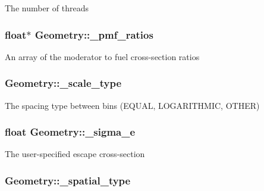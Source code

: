 The number of threads \hypertarget{classGeometry_a4bb0c2db80028191a363a79669e2508b}{
\subsubsection[{\-\_\-pmf\-\_\-ratios}]{\setlength{\rightskip}{0pt plus 5cm}float$\ast$ Geometry\-::\-\_\-pmf\-\_\-ratios\hspace{0.3cm}{\ttfamily [private]}}}\label{classGeometry_a4bb0c2db80028191a363a79669e2508b}
An array of the moderator to fuel cross-\/section ratios \hypertarget{classGeometry_a603f3cc50a03607fb94f4ce019235b5a}{
\subsubsection[{\-\_\-scale\-\_\-type}]{ Geometry\-::\-\_\-scale\-\_\-type\hspace{0.3cm}{\ttfamily [private]}}}\label{classGeometry_a603f3cc50a03607fb94f4ce019235b5a}
The spacing type between bins (E\-Q\-U\-A\-L, L\-O\-G\-A\-R\-I\-T\-H\-M\-I\-C, O\-T\-H\-E\-R) \hypertarget{classGeometry_a161dd81342c2018dc6af5db732385b67}{
\subsubsection[{\-\_\-sigma\-\_\-e}]{\setlength{\rightskip}{0pt plus 5cm}float Geometry\-::\-\_\-sigma\-\_\-e\hspace{0.3cm}{\ttfamily [private]}}}\label{classGeometry_a161dd81342c2018dc6af5db732385b67}
The user-\/specified escape cross-\/section \hypertarget{classGeometry_a2e9b473e54caa2c7742b4f676bedf91e}{
\subsubsection[{\-\_\-spatial\-\_\-type}]{ Geometry\-::\-\_\-spatial\-\_\-type\hspace{0.3cm}{\ttfamily [private]}}}\label{classGeometry_a2e9b473e54caa2c7742b4f676bedf91e}
